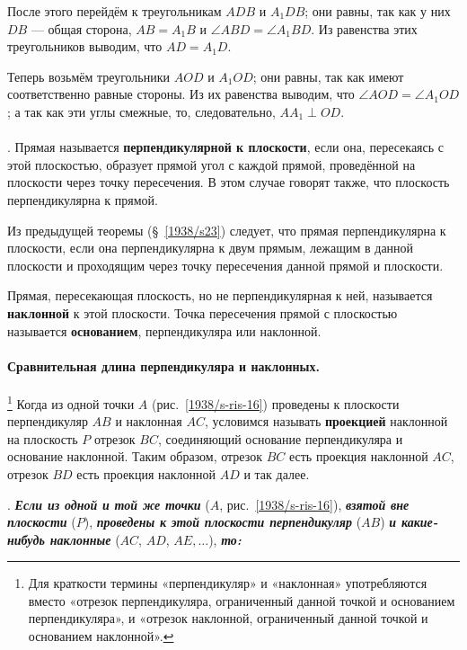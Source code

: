 После этого перейдём к треугольникам $ADB$ и $A_1DB$;
они равны, так как у них $DB$ — общая сторона, $AB=A_1B$ и $\angle ABD=\angle A_1BD$.
Из равенства этих треугольников выводим, что $AD=A_1D$.

Теперь возьмём треугольники $AOD$ и $A_1OD$;
они равны, так как имеют соответственно равные стороны.
Из их равенства выводим, что $\angle AOD=\angle A_1OD$;
а так как эти углы смежные, то, следовательно, $AA_1\perp OD$.

\paragraph{}\label{1938/s24}
.
Прямая называется \textbf{перпендикулярной к плоскости}, если она, пересекаясь с этой плоскостью, образует прямой угол с каждой прямой, проведённой на плоскости через точку пересечения.
В этом случае говорят также, что плоскость перпендикулярна к прямой.

Из предыдущей теоремы (§~\ref{1938/s23}) следует, что прямая перпендикулярна к плоскости, если она перпендикулярна к двум прямым, лежащим в данной плоскости и проходящим через точку пересечения данной прямой и плоскости.

Прямая, пересекающая плоскость, но не перпендикулярная к ней, называется \textbf{наклонной} к этой плоскости.
Точка пересечения прямой с плоскостью называется \textbf{основанием}, перпендикуляра или наклонной.


\paragraph{Сравнительная длина перпендикуляра и наклонных.}\label{1938/s25}%
\footnote{Для краткости термины «перпендикуляр» и «наклонная» употребляются вместо «отрезок перпендикуляра, ограниченный данной точкой и основанием перпендикуляра», и «отрезок наклонной, ограниченный данной точкой и основанием наклонной».}
Когда из одной точки $A$ (рис.~\ref{1938/s-ris-16}) проведены к плоскости перпендикуляр $AB$ и наклонная $AC$, условимся называть \textbf{проекцией} наклонной на плоскость $P$ отрезок $BC$, соединяющий основание перпендикуляра и основание наклонной.
Таким образом, отрезок $BC$ есть проекция наклонной $AC$, отрезок $BD$ есть проекция наклонной $AD$ и так далее.

\medskip

.
\textbf{\emph{Если из одной и той же точки}} ($A$, рис.~\ref{1938/s-ris-16}), \textbf{\emph{взятой вне плоскости}} ($P$), \textbf{\emph{проведены к этой плоскости перпендикуляр}} ($AB$) \textbf{\emph{и какие-нибудь наклонные}} ($AC$, $AD$, $AE,\dots$), \textbf{\emph{то:}}


